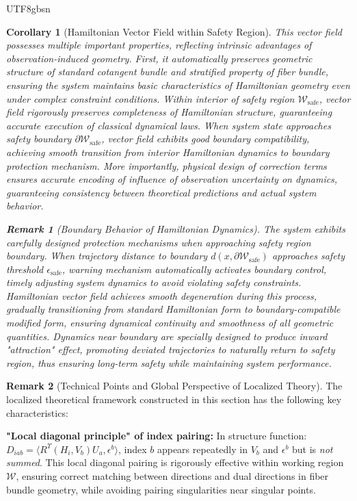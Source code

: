 \documentclass[a4paper,12pt]{extarticle}
\newtheorem{corollary}[theorem]{Corollary}
\theoremstyle{definition}
\newtheorem{remark}{Remark}
\begin{document}
\begin{CJK}{UTF8}{gbsn}
\begin{corollary}[Hamiltonian Vector Field within Safety Region]
This vector field possesses multiple important properties, reflecting intrinsic advantages of observation-induced geometry. First, it automatically preserves geometric structure of standard cotangent bundle and stratified property of fiber bundle, ensuring the system maintains basic characteristics of Hamiltonian geometry even under complex constraint conditions. Within interior of safety region $\mathcal{W}_{\text{safe}}$, vector field rigorously preserves completeness of Hamiltonian structure, guaranteeing accurate execution of classical dynamical laws. When system state approaches safety boundary $\partial \mathcal{W}_{\text{safe}}$, vector field exhibits good boundary compatibility, achieving smooth transition from interior Hamiltonian dynamics to boundary protection mechanism. More importantly, physical design of correction terms ensures accurate encoding of influence of observation uncertainty on dynamics, guaranteeing consistency between theoretical predictions and actual system behavior.

\begin{remark}[Boundary Behavior of Hamiltonian Dynamics]
The system exhibits carefully designed protection mechanisms when approaching safety region boundary. When trajectory distance to boundary $d(x,\partial \mathcal{W}_{\text{safe}})$ approaches safety threshold $\epsilon_{\text{safe}}$, warning mechanism automatically activates boundary control, timely adjusting system dynamics to avoid violating safety constraints. Hamiltonian vector field achieves smooth degeneration during this process, gradually transitioning from standard Hamiltonian form to boundary-compatible modified form, ensuring dynamical continuity and smoothness of all geometric quantities. Dynamics near boundary are specially designed to produce inward "attraction" effect, promoting deviated trajectories to naturally return to safety region, thus ensuring long-term safety while maintaining system performance.
\end{remark}


\end{corollary}


\begin{remark}[Technical Points and Global Perspective of Localized Theory]
The localized theoretical framework constructed in this section has the following key characteristics:

\textbf{"Local diagonal principle" of index pairing:} In structure function: \\
$D_{iab} = \langle R^{\Upsilon}(H_i, V_b)U_a, \epsilon^b \rangle$, index $b$ appears repeatedly in $V_b$ and $\epsilon^b$ but is \textit{not summed}. This local diagonal pairing is rigorously effective within working region $\mathcal{W}$, ensuring correct matching between directions and dual directions in fiber bundle geometry, while avoiding pairing singularities near singular points.


\end{remark}
\end{CJK}
\end{document}
